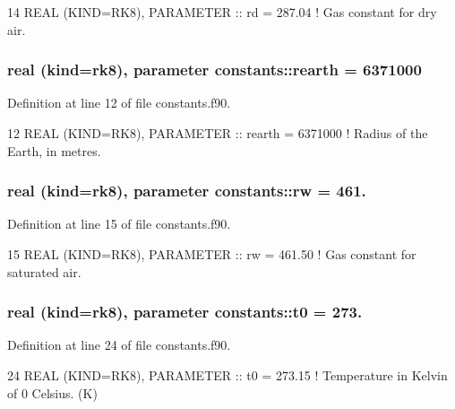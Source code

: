 \begin{DoxyCode}
14 \textcolor{keywordtype}{REAL (KIND=RK8)}, \textcolor{keywordtype}{PARAMETER}  :: rd       = 287.04            \textcolor{comment}{! Gas constant for dry air.}
\end{DoxyCode}
\subsubsection[{\texorpdfstring{rearth}{rearth}}]{\setlength{\rightskip}{0pt plus 5cm}real (kind=rk8), parameter constants\+::rearth = 6371000}\hypertarget{namespaceconstants_afaa5eaa2c9ee648a808fb8e1c94e76f8}{}\label{namespaceconstants_afaa5eaa2c9ee648a808fb8e1c94e76f8}


Definition at line 12 of file constants.\+f90.


\begin{DoxyCode}
12 \textcolor{keywordtype}{REAL (KIND=RK8)}, \textcolor{keywordtype}{PARAMETER}  :: rearth   = 6371000           \textcolor{comment}{! Radius of the Earth, in metres.}
\end{DoxyCode}
\subsubsection[{\texorpdfstring{rw}{rw}}]{\setlength{\rightskip}{0pt plus 5cm}real (kind=rk8), parameter constants\+::rw = 461.}\hypertarget{namespaceconstants_a7ef8fc37397fbfbefd3c22883378dcc5}{}\label{namespaceconstants_a7ef8fc37397fbfbefd3c22883378dcc5}


Definition at line 15 of file constants.\+f90.


\begin{DoxyCode}
15 \textcolor{keywordtype}{REAL (KIND=RK8)}, \textcolor{keywordtype}{PARAMETER}  :: rw       = 461.50            \textcolor{comment}{! Gas constant for saturated air.}
\end{DoxyCode}
\subsubsection[{\texorpdfstring{t0}{t0}}]{\setlength{\rightskip}{0pt plus 5cm}real (kind=rk8), parameter constants\+::t0 = 273.}\hypertarget{namespaceconstants_a753fbbdd5d5b4af00d6819cb78ba99a1}{}\label{namespaceconstants_a753fbbdd5d5b4af00d6819cb78ba99a1}


Definition at line 24 of file constants.\+f90.


\begin{DoxyCode}
24 \textcolor{keywordtype}{REAL (KIND=RK8)}, \textcolor{keywordtype}{PARAMETER}  :: t0       = 273.15            \textcolor{comment}{! Temperature in Kelvin of 0 Celsius. (K)}
\end{DoxyCode}
